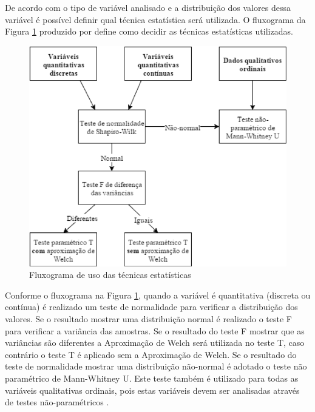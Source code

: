 De acordo com o tipo de variável analisado e a distribuição dos valores dessa variável é possível definir qual técnica
estatística será utilizada. O fluxograma da Figura \ref{fig:fluxograma-tecnica-moissa} produzido por 
define como decidir as técnicas estatísticas utilizadas.

\begin{figure}[htb]
  \caption{\label{fig:fluxograma-tecnica-moissa}Fluxograma de uso das técnicas estatísticas}
  \begin{center}
      \includegraphics[scale=1.0]{./Figuras/fluxograma-tecnicas-moissa.png}
  \end{center}
\end{figure}

Conforme o fluxograma na Figura \ref{fig:fluxograma-tecnica-moissa}, quando a variável é quantitativa (discreta ou contínua)
é realizado um teste de normalidade para verificar a distribuição dos valores. Se o resultado mostrar uma distribuição
normal é realizado o teste F para verificar a variância das amostras. Se o resultado do teste F mostrar que as variâncias
são diferentes a Aproximação de Welch será utilizada no teste T, caso contrário o teste T é aplicado sem a Aproximação de Welch.
Se o resultado do teste de normalidade mostrar uma distribuição não-normal é adotado o teste não paramétrico de
Mann-Whitney U. Este teste também é utilizado para todas as variáveis qualitativas ordinais, pois estas variáveis devem
ser analisadas através de testes não-paramétricos \cite{moissa2016influencia}.

